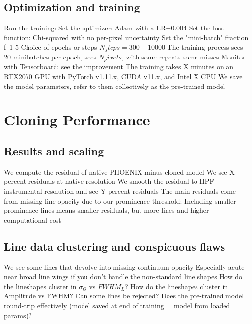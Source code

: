 \documentclass[modern]{aastex631}
\begin{document}
\subsection{Optimization and training}
\begin{outline}
  \1 Run the training:
  \1 Set the optimizer: Adam with a LR=0.004
  \1 Set the loss function: Chi-squared with no per-pixel uncertainty
  \1 Set the "mini-batch" fraction f~1-5%
  \1 Choice of epochs or steps $N_steps = 300-10000$
  \1 The training process sees 20 minibatches per epoch, sees $N_pixels$, with some repeats some misses
  \1 Monitor with Tensorboard: see the improvement
  \1 The training takes X minutes on an RTX2070 GPU with PyTorch v1.11.x, CUDA v11.x, and Intel X CPU
  \1 We save the model parameters, refer to them collectively as the pre-trained model
\end{outline}


\section{Cloning Performance}

\subsection{Results and scaling}

\begin{outline}
  \1 We compute the residual of native PHOENIX minus cloned model
  \1 We see X percent residuals at native resolution
  \1 We smooth the residual to HPF instrumental resolution and see Y percent residuals
  \1 The main residuals come from missing line opacity due to our prominence threshold:
  \1 Including smaller prominence lines means smaller residuals, but more lines and higher computational cost
\end{outline}

\subsection{Line data clustering and conspicuous flaws}
\begin{outline}
  \1 We see some lines that devolve into missing continuum opacity
  \1 Especially acute near broad line wings if you don't handle the non-standard line shapes
  \1 How do the lineshapes cluster in $\sigma_G$ vs $FWHM_L$?
  \1 How do the lineshapes cluster in Amplitude vs FWHM? Can some lines be rejected?
  \1 Does the pre-trained model round-trip effectively (model saved at end of training = model from loaded params)?
\end{outline}
\end{document}
